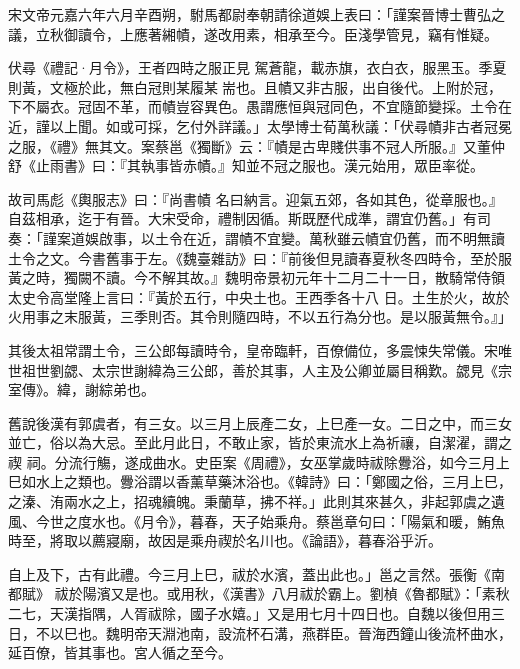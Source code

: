 \begin{pinyinscope}
 宋文帝元嘉六年六月辛酉朔，駙馬都尉奉朝請徐道娛上表曰：「謹案晉博士曹弘之議，立秋御讀令，上應著緗幘，遂改用素，相承至今。臣淺學管見，竊有惟疑。



 伏尋《禮記·月令》，王者四時之服正見
 駕蒼龍，載赤旗，衣白衣，服黑玉。季夏則黃，文極於此，無白冠則某履某耑也。且幘又非古服，出自後代。上附於冠，下不屬衣。冠固不革，而幘豈容異色。愚謂應恒與冠同色，不宜隨節變採。土令在近，謹以上聞。如或可採，乞付外詳議。」太學博士荀萬秋議：「伏尋幘非古者冠冕之服，《禮》無其文。案蔡邕《獨斷》云：『幘是古卑賤供事不冠人所服。』又董仲舒《止雨書》曰：『其執事皆赤幘。』知並不冠之服也。漢元始用，眾臣率從。



 故司馬彪《輿服志》曰：『尚書幘
 名曰納言。迎氣五郊，各如其色，從章服也。』自茲相承，迄于有晉。大宋受命，禮制因循。斯既歷代成準，謂宜仍舊。」有司奏：「謹案道娛啟事，以土令在近，謂幘不宜變。萬秋雖云幘宜仍舊，而不明無讀土令之文。今書舊事于左。《魏臺雜訪》曰：『前後但見讀春夏秋冬四時令，至於服黃之時，獨闕不讀。今不解其故。』魏明帝景初元年十二月二十一日，散騎常侍領太史令高堂隆上言曰：『黃於五行，中央土也。王西季各十八
 日。土生於火，故於火用事之末服黃，三季則否。其令則隨四時，不以五行為分也。是以服黃無令。』」



 其後太祖常謂土令，三公郎每讀時令，皇帝臨軒，百僚備位，多震悚失常儀。宋唯世祖世劉勰、太宗世謝緯為三公郎，善於其事，人主及公卿並屬目稱歎。勰見《宗室傳》。緯，謝綜弟也。



 舊說後漢有郭虞者，有三女。以三月上辰產二女，上巳產一女。二日之中，而三女並亡，俗以為大忌。至此月此日，不敢止家，皆於東流水上為祈禳，自潔濯，謂之禊
 祠。分流行觴，遂成曲水。史臣案《周禮》，女巫掌歲時祓除釁浴，如今三月上巳如水上之類也。釁浴謂以香薰草藥沐浴也。《韓詩》曰：「鄭國之俗，三月上巳，之溱、洧兩水之上，招魂續魄。秉蘭草，拂不祥。」此則其來甚久，非起郭虞之遺風、今世之度水也。《月令》，暮春，天子始乘舟。蔡邕章句曰：「陽氣和暖，鮪魚時至，將取以薦寢廟，故因是乘舟禊於名川也。《論語》，暮春浴乎沂。



 自上及下，古有此禮。今三月上巳，祓於水濱，蓋出此也。」邕之言然。張衡《南都賦》
 祓於陽濱又是也。或用秋，《漢書》八月祓於霸上。劉楨《魯都賦》：「素秋二七，天漢指隅，人胥祓除，國子水嬉。」又是用七月十四日也。自魏以後但用三日，不以巳也。魏明帝天淵池南，設流杯石溝，燕群臣。晉海西鐘山後流杯曲水，延百僚，皆其事也。宮人循之至今。




\end{pinyinscope}
